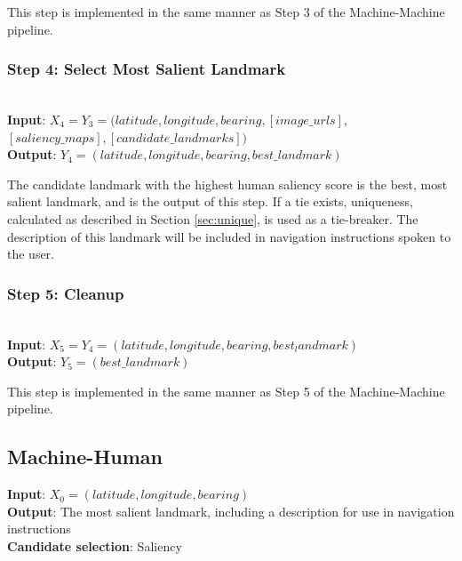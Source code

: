 This step is implemented in the same manner as Step 3 of the Machine-Machine pipeline.

\subsubsection*{Step 4: Select Most Salient Landmark}~\\
\noindent\textbf{Input}: $X_4 = Y_3 = (latitude, longitude, bearing,  [image\_urls], $\\$[saliency\_maps], [candidate\_landmarks] )$\\
\textbf{Output}: $Y_4 = (latitude, longitude, bearing, best\_landmark)$
 
The candidate landmark with the highest human saliency score is the best, most salient landmark, and is the output of this step. If a tie exists, uniqueness, calculated as described in Section \ref{sec:unique}, is used as a tie-breaker. The description of this landmark will be included in navigation instructions spoken to the user.

\subsubsection*{Step 5: Cleanup}~\\
\noindent\textbf{Input}: $X_5 = Y_4 = (latitude, longitude, bearing, best_landmark)$\\
\textbf{Output}: $Y_5 = (best\_landmark)$

This step is implemented in the same manner as Step 5 of the Machine-Machine pipeline.

\pagebreak
\subsection{Machine-Human}
\noindent\textbf{Input}: $X_0 = (latitude, longitude, bearing)$\\
\noindent\textbf{Output}: The most salient landmark, including a description for use in navigation instructions\\
\noindent\textbf{Candidate selection}: Saliency


